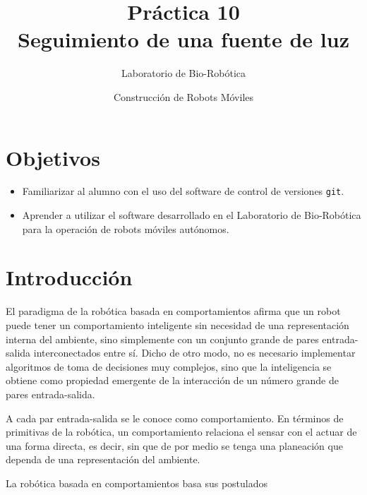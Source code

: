 \documentclass[a4paper,12pt]{article}
\title{Práctica 10 \\ Seguimiento de una fuente de luz}
\author{Laboratorio de Bio-Robótica}
\date{Construcción de Robots Móviles}
\begin{document}
\renewcommand{\tablename}{Tabla}
\maketitle
\section*{Objetivos}
\begin{itemize}
\item Familiarizar al alumno con el uso del software de control de versiones \texttt{git}.
\item Aprender a utilizar el software desarrollado en el Laboratorio de Bio-Robótica para la operación de robots móviles autónomos. 
\end{itemize}

\section{Introducción}
El paradigma de la robótica basada en comportamientos afirma que un robot puede tener un comportamiento inteligente sin necesidad de una representación interna del ambiente, sino simplemente con un conjunto grande de pares entrada-salida interconectados entre sí. Dicho de otro modo, no es necesario implementar algoritmos de toma de decisiones muy complejos, sino que la inteligencia se obtiene como propiedad emergente de la interacción de un número grande de pares entrada-salida. 

A cada par entrada-salida se le conoce como comportamiento. En términos de primitivas de la robótica, un comportamiento relaciona el sensar con el actuar de una forma directa, es decir, sin que de por medio se tenga una planeación que dependa de una representación del ambiente. 

La robótica basada en comportamientos basa sus postulados
\end{document}
